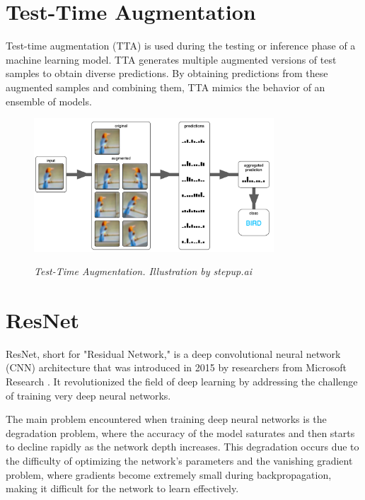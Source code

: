 \section{Test-Time Augmentation}

Test-time augmentation (TTA) is used during the testing or inference phase of a
machine learning model. TTA generates multiple augmented versions of test
samples to obtain diverse predictions. By obtaining predictions from these
augmented samples and combining them, TTA mimics the behavior of an ensemble of
models.

\begin{figure}[H]
  \centering
  \includegraphics[width=0.8\textwidth]{imatges/preliminaries/tta.png}
  \caption[Test-Time Augmentation]{\textit{Test-Time Augmentation. Illustration by stepup.ai}}
  {\label{fig:tta}}
\end{figure}

\newpage

\section{ResNet}

ResNet, short for "Residual Network," is a deep convolutional neural network
(CNN) architecture that was introduced in 2015 by researchers from Microsoft
Research \cite{ResNetPaper}. It revolutionized the field of deep learning by
addressing the challenge of training very deep neural networks. \newline

The main problem encountered when training deep neural networks is the
degradation problem, where the accuracy of the model saturates and then starts
to decline rapidly as the network depth increases. This degradation occurs due
to the difficulty of optimizing the network's parameters and the vanishing
gradient problem, where gradients become extremely small during
backpropagation, making it difficult for the network to learn effectively.
\newline

